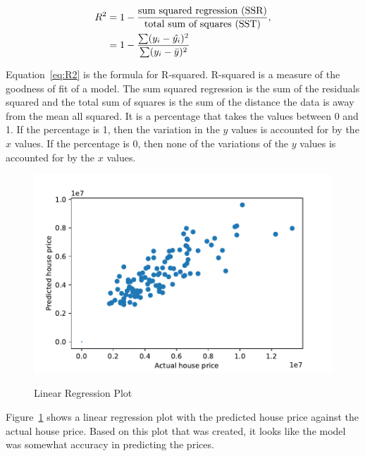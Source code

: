 \documentclass[12pt]{article}
\begin{document}

\begin{align}
\label{eq:R2}
\begin{split}
    R^2 &= 1 - \frac{\text{sum squared regression (SSR)}}{\text{total sum of squares (SST)}}, \\
    &= 1-\frac{\sum(y_i - \hat{y_i})^2 }{\sum(y_i - \Bar{y})^2} 
\end{split}
\end{align}

Equation~\ref{eq:R2} is the formula for R-squared. R-squared is a measure of the goodness of fit of a model. The sum squared regression is the sum of the residuals squared and the total sum of squares is the sum of the distance the data is away from the mean all squared. It is a percentage that takes the values between 0 and 1. If the percentage is 1, then the variation in the \(y\) values is accounted for by the \(x\) values. If the percentage is 0, then none of the variations of the \(y\) values is accounted for by the \(x\) values. \cite{kasuya2018}

\begin{figure}[h!]
    \caption{Linear Regression Plot}
    \includegraphics[width=1\textwidth]{linear_regression_plot.pdf}
    \label{fig:regression_plot}
\end{figure}
Figure~\ref{fig:regression_plot} shows a linear regression plot with the predicted house price against the actual house price. Based on this plot that was created, it looks like the model was somewhat accuracy in predicting the prices. 
\end{document}
